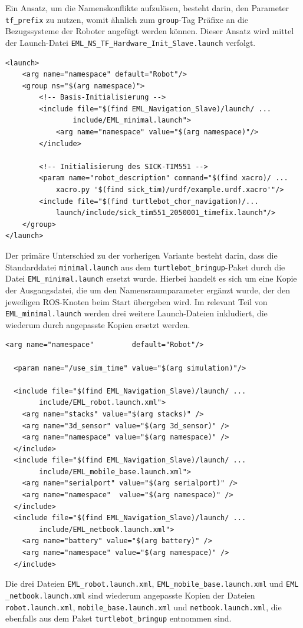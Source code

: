 Ein Ansatz, um die Namenskonflikte aufzulösen, besteht darin, den Parameter \lstinline{tf_prefix}{} zu nutzen, womit ähnlich zum \lstinline{group}{}-Tag Präfixe an die Bezugssysteme der Roboter angefügt werden können. Dieser Ansatz wird mittel der Launch-Datei \lstinline{EML_NS_TF_Hardware_Init_Slave.launch}{} verfolgt.
\begin{lstlisting}[caption={EML\_NS\_TF\_Hardware\_Init\_Slave.launch},captionpos=b]
<launch>
	<arg name="namespace" default="Robot"/>
	<group ns="$(arg namespace)">
		<!-- Basis-Initialisierung -->
		<include file="$(find EML_Navigation_Slave)/launch/ ...
				include/EML_minimal.launch">
			<arg name="namespace" value="$(arg namespace)"/>
		</include>
	
		<!-- Initialisierung des SICK-TIM551 -->
		<param name="robot_description" command="$(find xacro)/ ...
			xacro.py '$(find sick_tim)/urdf/example.urdf.xacro'"/>
		<include file="$(find turtlebot_chor_navigation)/...
			launch/include/sick_tim551_2050001_timefix.launch"/>
	</group>
</launch>

\end{lstlisting}
Der primäre Unterschied zu der vorherigen Variante besteht darin, dass die Standarddatei \lstinline{minimal.launch}{} aus dem \lstinline{turtlebot_bringup}{}-Paket durch die Datei \lstinline{EML_minimal.launch}{} ersetzt wurde. Hierbei handelt es sich um eine Kopie der Ausgangsdatei, die um den Namensraumparameter ergänzt wurde, der den jeweiligen ROS-Knoten beim Start übergeben wird. Im relevant Teil von \lstinline{EML_minimal.launch}{} werden drei weitere Launch-Dateien inkludiert, die wiederum durch angepasste Kopien ersetzt werden.
\begin{lstlisting}[caption={Ausschnitt aus EML\_minimal.launch},captionpos=b]
 <arg name="namespace"         default="Robot"/>

  <param name="/use_sim_time" value="$(arg simulation)"/>

  <include file="$(find EML_Navigation_Slave)/launch/ ...
  		include/EML_robot.launch.xml">
    <arg name="stacks" value="$(arg stacks)" />
    <arg name="3d_sensor" value="$(arg 3d_sensor)" />
    <arg name="namespace" value="$(arg namespace)" />
  </include>
  <include file="$(find EML_Navigation_Slave)/launch/ ...
  		include/EML_mobile_base.launch.xml">
    <arg name="serialport" value="$(arg serialport)" />
    <arg name="namespace"  value="$(arg namespace)" />
  </include>
  <include file="$(find EML_Navigation_Slave)/launch/ ...
  		include/EML_netbook.launch.xml">
    <arg name="battery" value="$(arg battery)" />
    <arg name="namespace" value="$(arg namespace)" />
  </include>
\end{lstlisting}
Die drei Dateien \lstinline{EML_robot.launch.xml}{}, \lstinline{EML_mobile_base.launch.xml}{} und \lstinline{EML}{} \lstinline{_netbook.launch.xml}{} sind wiederum angepasste Kopien der Dateien \linebreak \lstinline{robot.launch.xml}{}, \lstinline{mobile_base.launch.xml}{} und \lstinline{netbook.launch.xml}{}, die ebenfalls aus dem Paket \lstinline{turtlebot_bringup}{} entnommen sind. 

